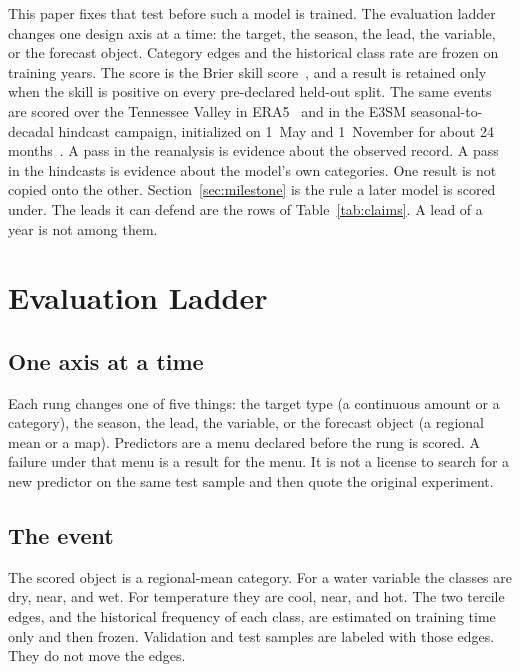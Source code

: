 \documentclass{ametsocV6.2}
\begin{document}
This paper fixes that test before such a model is trained.
The evaluation ladder changes one design axis at a time: the target, the season, the lead, the variable, or the forecast object.
Category edges and the historical class rate are frozen on training years.
The score is the Brier skill score~\citep{brier1950,wilks2011}, and a result is retained only when the skill is positive on every pre-declared held-out split.
The same events are scored over the Tennessee Valley in ERA5~\citep{hersbach2020era5} and in the E3SM seasonal-to-decadal hindcast campaign, initialized on 1~May and 1~November for about 24 months~\citep{golaz2022e3sm}.
A pass in the reanalysis is evidence about the observed record.
A pass in the hindcasts is evidence about the model's own categories.
One result is not copied onto the other.
Section~\ref{sec:milestone} is the rule a later model is scored under.
The leads it can defend are the rows of Table~\ref{tab:claims}.
A lead of a year is not among them.

\section{Evaluation Ladder}
\label{sec:method}

\subsection{One axis at a time}
\label{sec:axis}

Each rung changes one of five things: the target type (a continuous amount or a category), the season, the lead, the variable, or the forecast object (a regional mean or a map).
Predictors are a menu declared before the rung is scored.
A failure under that menu is a result for the menu.
It is not a license to search for a new predictor on the same test sample and then quote the original experiment.

\subsection{The event}
\label{sec:event}

The scored object is a regional-mean category.
For a water variable the classes are dry, near, and wet.
For temperature they are cool, near, and hot.
The two tercile edges, and the historical frequency of each class, are estimated on training time only and then frozen.
Validation and test samples are labeled with those edges.
They do not move the edges.
\end{document}
